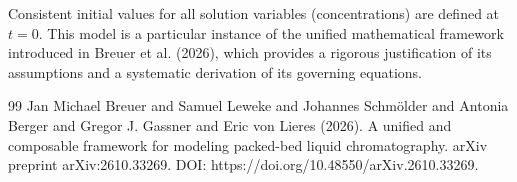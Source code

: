 \documentclass{article}
\begin{document}
Consistent initial values for all solution variables (concentrations) are defined at $t = 0$.
This model is a particular instance of the unified mathematical framework introduced in Breuer et al. (2026), which provides a rigorous justification of its assumptions and a systematic derivation of its governing equations.
\begin{thebibliography}{99}
     Jan Michael Breuer and Samuel Leweke and Johannes Schmölder and Antonia Berger and Gregor J. Gassner and Eric von Lieres (2026). A unified and composable framework for modeling packed-bed liquid chromatography. arXiv preprint arXiv:2610.33269. DOI: https://doi.org/10.48550/arXiv.2610.33269.
\end{thebibliography}
\end{document}
